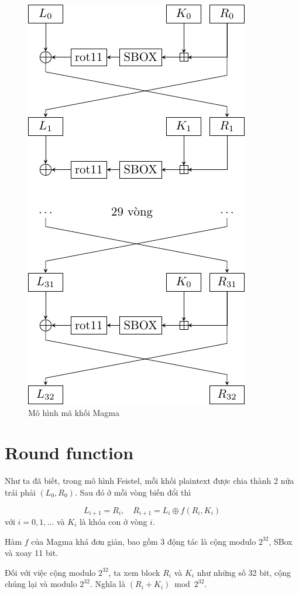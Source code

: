 \begin{figure}[ht]
    \centering
    \includegraphics{../pics/magma/blocky.pdf}
    \caption{Mô hình mã khối Magma}
\end{figure}

\section{Round function}

Như ta đã biết, trong mô hình Feistel, mỗi khối plaintext
được chia thành 2 nửa trái phải $(L_0, R_0)$. Sau đó ở mỗi vòng
biến đổi thì

\[L_{i+1} = R_i, \quad R_{i+1} = L_i \oplus f(R_i, K_i)\]
với $i=0, 1, \ldots$ và $K_i$ là khóa con ở vòng $i$.

Hàm $f$ của Magma khá đơn giản, bao gồm 3 động tác là cộng modulo 
$2^{32}$, SBox và xoay 11 bit.

Đối với việc cộng modulo $2^{32}$, ta xem block $R_i$ và $K_i$ như
những số 32 bit, cộng chúng lại và modulo $2^{32}$. Nghĩa là 
$(R_i + K_i) \bmod 2^{32}$.

